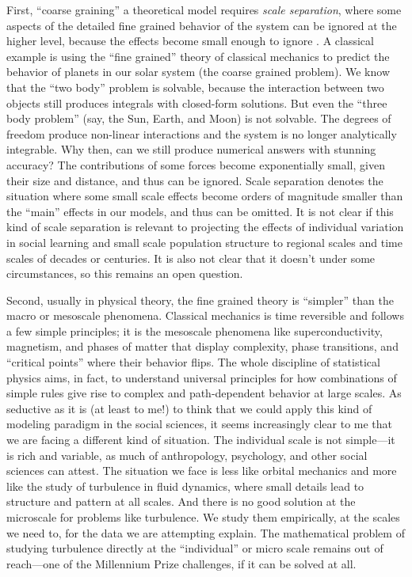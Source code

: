 First, ``coarse graining'' a theoretical model requires \emph{scale separation}, where some aspects of the detailed fine grained behavior of the system can be ignored at the higher level, because the effects become small enough to ignore \citep{hillerbrand2015explanation}.  A classical example is using the ``fine grained'' theory of classical mechanics to predict the behavior of planets in our solar system (the coarse grained problem). We know that the ``two body'' problem is solvable, because the interaction between two objects still produces integrals with closed-form solutions.  But even the ``three body problem'' (say, the Sun, Earth, and Moon) is not solvable.  The degrees of freedom produce non-linear interactions and the system is no longer analytically integrable.  Why then, can we still produce numerical answers with stunning accuracy?  The contributions of some forces become exponentially small, given their size and distance, and thus can be ignored.  Scale separation denotes the situation where some small scale effects become orders of magnitude smaller than the ``main'' effects in our models, and thus can be omitted.  It is not clear if this kind of scale separation is relevant to projecting the effects of individual variation in social learning and small scale population structure to regional scales and time scales of decades or centuries.  It is also not clear that it doesn't under some circumstances, so this remains an open question.

Second, usually in physical theory, the fine grained theory is ``simpler'' than the macro or mesoscale phenomena.  Classical mechanics is time reversible and follows a few simple principles; it is the mesoscale phenomena like superconductivity, magnetism, and phases of matter that display complexity, phase transitions, and ``critical points'' where their behavior flips.  The whole discipline of statistical physics aims, in fact, to understand universal principles for how combinations of simple rules give rise to complex and path-dependent behavior at large scales.  As seductive as it is (at least to me!) to think that we could apply this kind of modeling paradigm in the social sciences, it seems increasingly clear to me that we are facing a different kind of situation.  The individual scale is not simple---it is rich and variable, as much of anthropology, psychology, and other social sciences can attest.  The situation we face is less like orbital mechanics and more like the study of turbulence in fluid dynamics, where small details lead to structure and pattern at all scales.  And there is no good solution at the microscale for problems like turbulence.  We study them empirically, at the scales we need to, for the data we are attempting explain.  The mathematical problem of studying turbulence directly at the ``individual'' or micro scale remains out of reach---one of the Millennium Prize challenges, if it can be solved at all.


